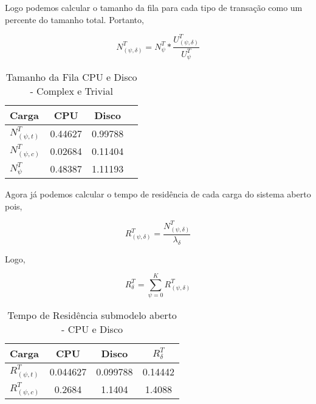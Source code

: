 \documentclass[11pt,a4paper]{abntex2}
\begin{document}
Logo podemos calcular o tamanho da fila para cada tipo de transação como um percente do tamanho total. Portanto,

\begin{equation}
N^{T}_{(\psi,\delta)} = N^{T}_{\psi}*\frac{U^{T}_{(\psi,\delta)}}{U^{T}_{\psi}}
\end{equation}

\begin{table}[htbp]
	\centering
	\caption{Tamanho da Fila CPU e Disco - Complex e Trivial} 
	\begin{tabular}{lccc}
		\toprule
		Carga            & CPU    & Disco \\
		\midrule
		$N^{T}_{(\psi,t)}$ & 0.44627 & 0.99788\\[3pt]
		$N^{T}_{(\psi,c)}$ & 0.02684 & 0.11404\\[3pt]
		$N^{T}_{\psi}$   & 0.48387 & 1.11193 \\[3pt]
		\bottomrule
	\end{tabular}%
	\label{tab:addlabel}%
\end{table}%



Agora já podemos calcular o tempo de residência de cada carga do sistema aberto pois,

\begin{equation}
R^{T}_{(\psi,\delta)} = \frac{N^{T}_{(\psi,\delta)}}{\lambda_{\delta}}
\end{equation}

Logo,

\begin{equation}
R^{T}_{\delta} = \sum_{\psi=0}^{K} R^{T}_{(\psi,\delta)}
\end{equation}

\begin{table}[htbp]
	\centering
	\caption{Tempo de Residência submodelo aberto - CPU e Disco} 
	\begin{tabular}{lccc}
		\toprule
		Carga              & CPU     & Disco     & $R^{T}_{\delta}$ \\
		\midrule
		$R^{T}_{(\psi,t)}$ & 0.044627 & 0.099788 & 0.14442  \\[3pt]
		$R^{T}_{(\psi,c)}$ & 0.2684   & 1.1404   & 1.4088 \\[3pt]
		   
		\bottomrule
	\end{tabular}%
	\label{tab:TR_t}%
\end{table}%
\end{document}
